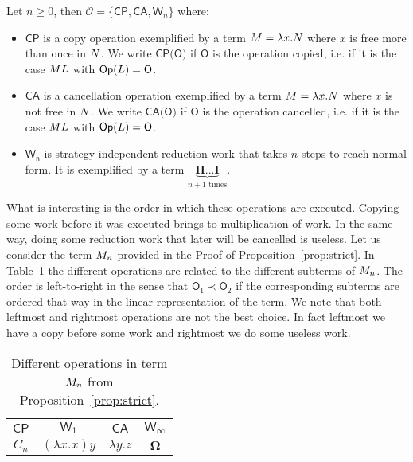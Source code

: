 \begin{definition} Let $n\geq 0$, then $\mathcal{O}=\{\textsf{CP},\textsf{CA},\textsf{W}_n\}$ where:
	\begin{itemize}
		\item $\textsf{CP}$ is a copy operation exemplified by a term $M=\lambda x.N$ where $x$ is free more than once in $N$. We write $\textsf{CP(O)}$ if $\mathsf{O}$ is the operation copied, i.e. if it is the case $ML$ with $\mathsf{Op}(L)=\mathsf{O}$.
		\item $\textsf{CA}$ is a cancellation operation exemplified by a term $M=\lambda x.N$ where $x$ is not free in $N$. We write $\textsf{CA(O)}$ if $\mathsf{O}$ is the operation cancelled, i.e. if it is the case $ML$ with $\mathsf{Op}(L)=\mathsf{O}$.
		\item $\mathsf{W_n}$ is strategy independent reduction work that takes $n$ steps to reach normal form. It is exemplified by a term $\underbrace{\textbf{II...I}}_{n+1\text{ times}}$.
	\end{itemize}
\end{definition}
What is interesting is the order in which these operations are executed. Copying some work before it was executed brings to multiplication of work. In the same way, doing some reduction work that later will be cancelled is useless. Let us consider the term $M_n$ provided in the Proof of Proposition~\ref{prop:strict}. In Table~\ref{table:op1} the different operations are related to the different subterms of $M_n$. The order is left-to-right in the sense that $\textsf{O}_1\prec\mathsf{O}_2$ if the corresponding subterms are ordered that way in the linear representation of the term. We note that both leftmost and rightmost operations are not the best choice. In fact leftmost we have a copy before some work and rightmost we do some useless work.
\begin{table}
\begin{center}
\begin{tabular}{|c|c|c|c|}
	\hline 
	$ \textsf{CP} $ & $ \textsf{W}_1 $ & $ \textsf{CA} $ & $ \textsf{W}_\infty $\tabularnewline
	\hline 
	$C_n$ & $(\lambda x.x)y$ & $\lambda y.z$ & $\bm{\Omega}$\tabularnewline
	\hline 
\end{tabular}
\end{center}
\caption{Different operations in term $M_n$ from Proposition~\ref{prop:strict}.}
\label{table:op1}
\end{table}
